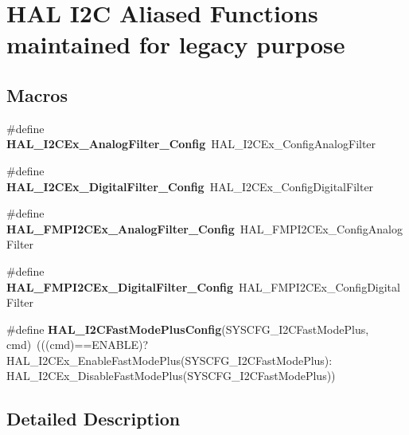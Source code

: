 \hypertarget{group___h_a_l___i2_c___aliased___functions}{\section{H\-A\-L I2\-C Aliased Functions maintained for legacy purpose}
\label{group___h_a_l___i2_c___aliased___functions}
}
\subsection*{Macros}
\begin{DoxyCompactItemize}
\item 
\hypertarget{group___h_a_l___i2_c___aliased___functions_ga29a6d7298eb9b8290229e37a6eee9c21}{\#define {\bfseries H\-A\-L\-\_\-\-I2\-C\-Ex\-\_\-\-Analog\-Filter\-\_\-\-Config}~H\-A\-L\-\_\-\-I2\-C\-Ex\-\_\-\-Config\-Analog\-Filter}\label{group___h_a_l___i2_c___aliased___functions_ga29a6d7298eb9b8290229e37a6eee9c21}

\item 
\hypertarget{group___h_a_l___i2_c___aliased___functions_gad145cb83d816a71f5f8085e5abb9cf8a}{\#define {\bfseries H\-A\-L\-\_\-\-I2\-C\-Ex\-\_\-\-Digital\-Filter\-\_\-\-Config}~H\-A\-L\-\_\-\-I2\-C\-Ex\-\_\-\-Config\-Digital\-Filter}\label{group___h_a_l___i2_c___aliased___functions_gad145cb83d816a71f5f8085e5abb9cf8a}

\item 
\hypertarget{group___h_a_l___i2_c___aliased___functions_gab58dc8da5184549e6b0ada3895968b2d}{\#define {\bfseries H\-A\-L\-\_\-\-F\-M\-P\-I2\-C\-Ex\-\_\-\-Analog\-Filter\-\_\-\-Config}~H\-A\-L\-\_\-\-F\-M\-P\-I2\-C\-Ex\-\_\-\-Config\-Analog\-Filter}\label{group___h_a_l___i2_c___aliased___functions_gab58dc8da5184549e6b0ada3895968b2d}

\item 
\hypertarget{group___h_a_l___i2_c___aliased___functions_ga26c863f7dd300fa407da0a808888c8d2}{\#define {\bfseries H\-A\-L\-\_\-\-F\-M\-P\-I2\-C\-Ex\-\_\-\-Digital\-Filter\-\_\-\-Config}~H\-A\-L\-\_\-\-F\-M\-P\-I2\-C\-Ex\-\_\-\-Config\-Digital\-Filter}\label{group___h_a_l___i2_c___aliased___functions_ga26c863f7dd300fa407da0a808888c8d2}

\item 
\hypertarget{group___h_a_l___i2_c___aliased___functions_ga340e0d97db96b108c18718d4b37bdb29}{\#define {\bfseries H\-A\-L\-\_\-\-I2\-C\-Fast\-Mode\-Plus\-Config}(S\-Y\-S\-C\-F\-G\-\_\-\-I2\-C\-Fast\-Mode\-Plus, cmd)~(((cmd)==E\-N\-A\-B\-L\-E)? H\-A\-L\-\_\-\-I2\-C\-Ex\-\_\-\-Enable\-Fast\-Mode\-Plus(S\-Y\-S\-C\-F\-G\-\_\-\-I2\-C\-Fast\-Mode\-Plus)\-: H\-A\-L\-\_\-\-I2\-C\-Ex\-\_\-\-Disable\-Fast\-Mode\-Plus(S\-Y\-S\-C\-F\-G\-\_\-\-I2\-C\-Fast\-Mode\-Plus))}\label{group___h_a_l___i2_c___aliased___functions_ga340e0d97db96b108c18718d4b37bdb29}

\end{DoxyCompactItemize}


\subsection{Detailed Description}
